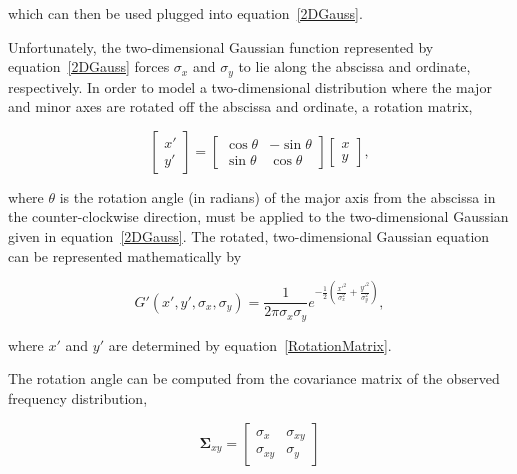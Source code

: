 \noindent which can then be used plugged into \mbox{equation \ref{2DGauss}}.

Unfortunately, the two-dimensional Gaussian function represented by \mbox{equation \ref{2DGauss}} forces $\sigma_x$ and $\sigma_y$ to lie along the abscissa and ordinate, respectively.
In order to model a two-dimensional distribution where the major and minor axes are rotated off the abscissa and ordinate, a rotation matrix,

    \begin{equation}
        \label{RotationMatrix}
        \begin{bmatrix}
            x' \\ y'
        \end{bmatrix}
        =
        \begin{bmatrix}
            \cos{\theta} & -\sin{\theta} \\
            \sin{\theta} & \cos{\theta}
        \end{bmatrix}
        \begin{bmatrix}
            x \\ y
        \end{bmatrix},
    \end{equation}

\noindent where $\theta$ is the rotation angle (in radians) of the major axis from the abscissa in the counter-clockwise direction, must be applied to the two-dimensional Gaussian given in \mbox{equation \ref{2DGauss}}.
The rotated, two-dimensional Gaussian equation can be represented mathematically by

    \begin{equation}
        \label{2DRotatedGauss}
        G'(x', y', \sigma_x, \sigma_y) = \frac{1}{2 \pi \sigma_x \sigma_y} e^{- \frac{1}{2} \left( \frac{x'^2}{\sigma_x^2} + \frac{y'^2}{\sigma_y^2} \right)},
    \end{equation}

\noindent where $x'$ and $y'$ are determined by \mbox{equation \ref{RotationMatrix}}.

The rotation angle can be computed from the covariance matrix of the observed frequency distribution,

    \begin{equation}
        \label{CovMatrix}
        \boldsymbol{\Sigma}_{xy} =
        \begin{bmatrix}
            \sigma_x & \sigma_{xy} \\
            \sigma_{xy} & \sigma_y
        \end{bmatrix}
    \end{equation}


